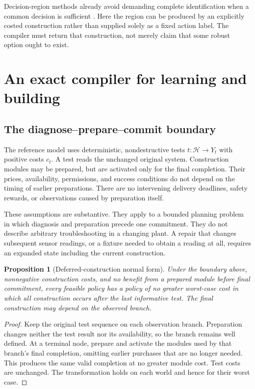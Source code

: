 \documentclass[11pt,letterpaper]{article}
\newcommand{\Hset}{\mathcal H}\newcommand{\Pset}{\mathcal P}\newcommand{\Tset}{\mathcal T}
\newtheorem{proposition}{Proposition}[section]
\theoremstyle{remark}\newtheorem{remark}{Remark}[section]
\begin{document}
Decision-region methods already avoid demanding complete identification when a common decision is sufficient \citep{javdani}. Here the region can be produced by an explicitly costed construction rather than supplied solely as a fixed action label. The compiler must return that construction, not merely claim that some robust option ought to exist.

\section{An exact compiler for learning and building}
\label{sec:compiler}
\subsection{The diagnose--prepare--commit boundary}
The reference model uses deterministic, nondestructive tests $t:\Hset\to Y_t$ with positive costs $c_t$. A test reads the unchanged original system. Construction modules may be prepared, but are activated only for the final completion. Their prices, availability, permissions, and success conditions do not depend on the timing of earlier preparations. There are no intervening delivery deadlines, safety rewards, or observations caused by preparation itself.

These assumptions are substantive. They apply to a bounded planning problem in which diagnosis and preparation precede one commitment. They do not describe arbitrary troubleshooting in a changing plant. A repair that changes subsequent sensor readings, or a fixture needed to obtain a reading at all, requires an expanded state including the current construction.

\begin{proposition}[Deferred-construction normal form]\label{prop:postpone}
Under the boundary above, nonnegative construction costs, and no benefit from a prepared module before final commitment, every feasible policy has a policy of no greater worst-case cost in which all construction occurs after the last informative test. The final construction may depend on the observed branch.
\end{proposition}
\begin{proof}
Keep the original test sequence on each observation branch. Preparation changes neither the test result nor its availability, so the branch remains well defined. At a terminal node, prepare and activate the modules used by that branch's final completion, omitting earlier purchases that are no longer needed. This produces the same valid completion at no greater module cost. Test costs are unchanged. The transformation holds on each world and hence for their worst case.
\end{proof}
\end{document}
